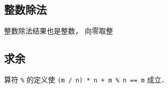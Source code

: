 
\subsection{整数除法}
整数除法结果也是整数， 向零取整

\subsection{求余}
算符 \verb|%| 的定义使 \verb|(m / n) * n + m % n == m| 成立．
